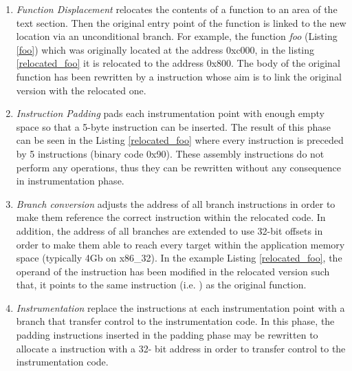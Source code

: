\begin{enumerate}

\item \emph{Function Displacement} relocates the contents of a function to an area of
								   the text section. Then the original entry point of 	
								   the function is linked to the new location via an	
								   unconditional branch. For example, the function \emph{foo} (Listing \ref{foo}) 
								   which was originally located at the address 0xc000, in the listing  					
								   \ref{relocated_foo} it is relocated to the address 0x800.
								   The  body of the original function has been rewritten by a  instruction whose aim is to link the original version with the relocated
								   one.
								    
\item \emph{Instruction Padding}   pads each instrumentation point with enough empty space so that a 5-byte 
								   instruction can be inserted. The result of this phase can be seen in the Listing    								   \ref{relocated_foo} where every instruction is preceded by 5  instructions
								   (binary code 0x90). These assembly instructions do not perform any operations, thus 
								   they can be rewritten without any consequence in instrumentation phase.
								  
								   
\item \emph{Branch conversion}	  adjusts the address of all branch instructions in order to make them reference the 
								  correct instruction within the relocated code. In addition, the address of all 
								  branches are extended to use 32-bit offsets in order to make them able to reach 
								  every target within the application memory space (typically 4Gb on x86\_32). 
								  In the example Listing \ref{relocated_foo}, the operand of the instruction  has been modified in the relocated version such that, it points to the same
								  instruction (i.e. ) as the original function.   


								
\item \emph{Instrumentation}	 replace the instructions at each instrumentation point with a branch that transfer
								 control to the instrumentation code. In this phase, the padding instructions inserted 
								 in the padding phase may be rewritten to allocate a  instruction with a 32-
								 bit address in order to transfer control to the instrumentation code.

\end{enumerate}

